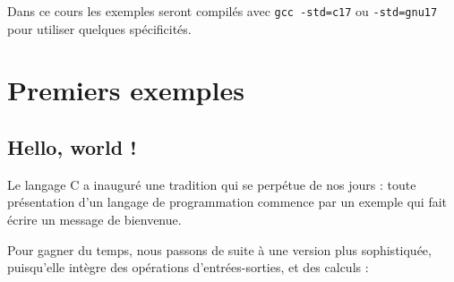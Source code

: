 \documentclass[10pt]{article}
\begin{document}
Dans ce cours  les exemples seront compilés
avec \texttt{gcc -std=c17} ou
\texttt{-std=gnu17} pour utiliser quelques spécificités.

 \section{Premiers exemples}

\subsection{Hello, world !}

 Le langage C a inauguré une tradition qui se perpétue de nos jours : 
 toute présentation d'un langage de programmation commence par un 
 exemple qui fait écrire un message de bienvenue. 
 
 Pour gagner du temps, nous passons de suite à une version plus sophistiquée, 
puisqu'elle intègre des opérations d'entrées-sorties, et des calculs :
 
\end{document}

